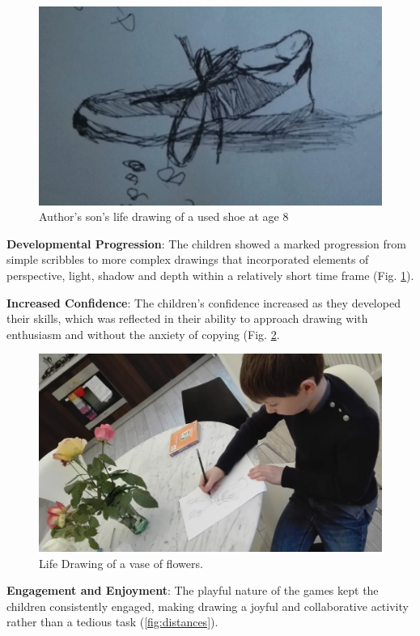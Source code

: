\documentclass{article}
\begin{document}
\begin{figure}
    \centering
    \includegraphics[width=0.5\linewidth]{Screenshot 2025-01-06 at 08.42.30.png}
    \caption{Author's son's life drawing of a used shoe at age 8}
    \label{fig:shoe}
\end{figure}

\textbf{Developmental Progression}: The children showed a marked progression from simple scribbles to more complex drawings that incorporated elements of perspective, light, shadow and depth within a relatively short time frame (Fig. \ref{fig:shoe}).

\textbf{Increased Confidence}: The children’s confidence increased as they developed their skills, which was reflected in their ability to approach drawing with enthusiasm and without the anxiety of copying (Fig. \ref{fig:flowers}.

\begin{figure}
    \centering
    \includegraphics[width=0.5\linewidth]{Screenshot 2025-01-06 at 08.40.09.png}
    \caption{Life Drawing of a vase of flowers. }
    \label{fig:flowers}
\end{figure}

\textbf{Engagement and Enjoyment}: The playful nature of the games kept the children consistently engaged, making drawing a joyful and collaborative activity rather than a tedious task (\ref{fig:distances}).
\end{document}
